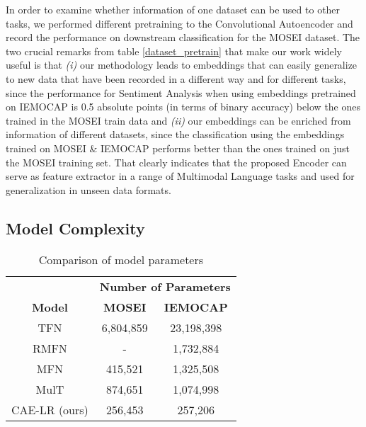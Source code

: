 In order to examine whether information of one dataset can be used to other tasks, we performed different pretraining to the Convolutional Autoencoder and record the performance on downstream classification for the MOSEI dataset. The two crucial remarks from table \ref{dataset_pretrain} that make our work widely useful is that \textit{(i)} our methodology leads to embeddings that can easily generalize to new data that have been recorded in a different way and for different tasks, since the performance for Sentiment Analysis when using embeddings pretrained on IEMOCAP is 0.5 absolute points (in terms of binary accuracy) below the ones trained in the MOSEI train data and \textit{(ii)} our embeddings can be enriched from information of different datasets, since the classification using the embeddings trained on MOSEI \& IEMOCAP performs better than the ones trained on just the MOSEI training set. That clearly indicates that the proposed Encoder can serve as feature extractor in a range of Multimodal Language tasks and used for generalization in unseen data formats.

\subsection{Model Complexity}

\begin{table}
\centering
\caption{Comparison of model parameters\label{complexity_comparison}}
\begin{tabular}{ccc}
{ \textbf{}}                          & \multicolumn{2}{c}{{ \textbf{Number of Parameters}}}        \\
{ \textbf{Model}}                     & { \textbf{MOSEI}} & { \textbf{IEMOCAP}} \\ \hline
{ TFN}                                & { 6,804,859}      & { 23,198,398}       \\
{ RMFN}                               & { -}              & { 1,732,884}        \\
{ MFN}                                & { 415,521}        & { 1,325,508}        \\
{ MulT}                               & { 874,651}        & { 1,074,998}        \\
{ CAE-LR (ours)} & { 256,453}        & { 257,206}         
\end{tabular}
\end{table}

